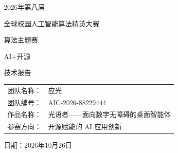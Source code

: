 \begin{titlepage}
\thispagestyle{empty}
\begin{center}
\vspace*{16mm}
{\fontsize{22}{31}\selectfont 2026年第八届\par}
{\fontsize{22}{31}\selectfont 全球校园人工智能算法精英大赛\par}
\vspace{21mm}
{\fontsize{22}{31}\selectfont 算法主题赛\par}
{\fontsize{22}{31}\selectfont AI+开源\par}
{\fontsize{22}{31}\selectfont 技术报告\par}
\vspace{28mm}
{\fontsize{16}{30}\selectfont
\renewcommand{\arraystretch}{1.5}
\begin{tabular}{@{}rl@{}}
团队名称：&应光\\
团队编号：&AIC-2026-88229444\\
作品名称：&{\fontsize{14}{30}\selectfont 光语者——面向数字无障碍的桌面智能体}\\
参赛方向：&开源赋能的 AI 应用创新\\
\end{tabular}\par}
\vfill
{\fontsize{16}{24}\selectfont 日期：2026年10月26日\par}
\vspace*{4mm}
\end{center}
\end{titlepage}
